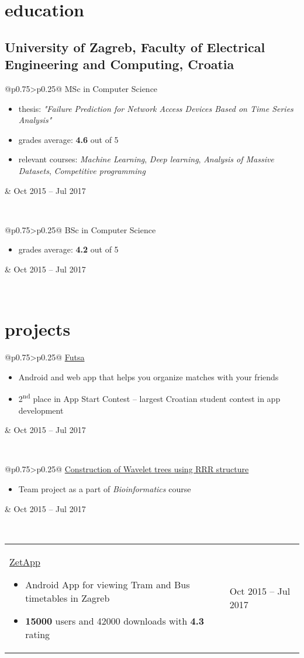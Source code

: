 \documentclass[a4paper]{article}
\makeatletter
\newlength{\tablewidth}
\newenvironment{period}[2]{%
\newcommand{\sarma}{#2}%
\setlength{\tablewidth}{\linewidth}
\addtolength{\tablewidth}{-2\tabcolsep}
\begin{tabular}{@{}p{0.75\tablewidth}>{\raggedleft\arraybackslash}p{0.25\tablewidth}@{}}%
#1 \newline
\begin{itemize}
}{%
\end{itemize} & \sarma \\%
\end{tabular}\\
}
\makeatother
\begin{document}
\section{education}
\subsection{University of Zagreb, Faculty of Electrical Engineering and Computing, Croatia}
\begin{period}{MSc in Computer Science}{Oct 2015 -- Jul 2017}
    \item thesis:
        \textit{"Failure Prediction for Network Access Devices Based on Time Series Analysis"}
    \item grades average: \textbf{4.6} out of 5
    \item relevant courses:
        \textit{Machine Learning},
        \textit{Deep learning},
        \textit{Analysis of Massive Datasets},
        \textit{Competitive programming}
\end{period}
\begin{period}{BSc in Computer Science}{Oct 2012 -- Jul 2015}
    \item grades average: \textbf{4.2} out of 5
\end{period}

\section{projects}

\begin{period}{\href{http://futsa.net}{Futsa}}{Feb 2017 -- Jun 2017}
	\item Android and web app that helps you organize matches with your friends
	\item
		2\textsuperscript{nd} place in App Start Contest -- largest Croatian student contest in app development

\end{period}

\begin{period}{\href{https://github.com/mmagerl/bioinformatics-project}{Construction of Wavelet trees using RRR structure}}{Oct 2016 -- Jan 2017}
	\item 
		Team project as a part of \textit{Bioinformatics} course
\end{period}


\begin{period}{\href{http://tinyurl.com/zetapp}{ZetApp}}{Apr 2015}
	\item Android App for viewing Tram and Bus timetables in Zagreb
	\item \textbf{15000} users and 42000 downloads with \textbf{4.3} rating
\end{period}
\end{document}
